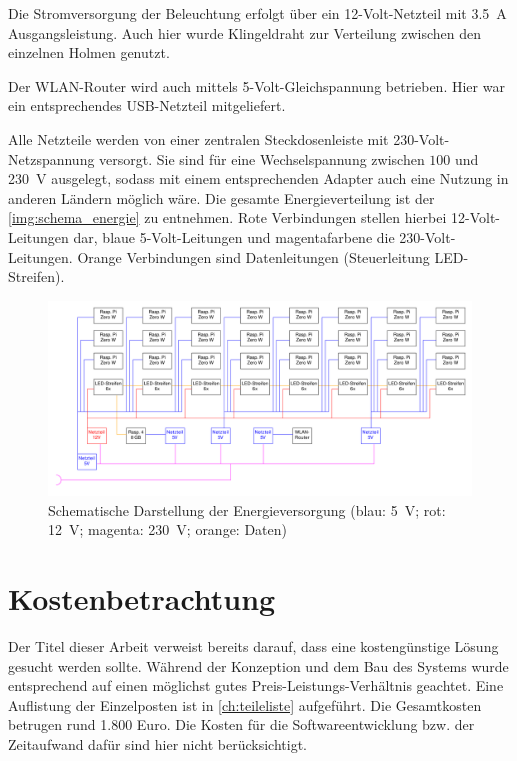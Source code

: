 \documentclass[./00PhotoBox.tex]{subfiles}
\begin{document}
Die Stromversorgung der Beleuchtung erfolgt über ein 12-Volt-Netzteil mit \SI{3,5}{\ampere} Ausgangsleistung. Auch hier wurde Klingeldraht zur Verteilung zwischen den einzelnen Holmen genutzt.

Der WLAN-Router wird auch mittels 5-Volt-Gleichspannung betrieben. Hier war ein entsprechendes USB-Netzteil mitgeliefert.

Alle Netzteile werden von einer zentralen Steckdosenleiste mit 230-Volt-Netzspannung versorgt. Sie sind für eine Wechselspannung zwischen $100$ und \SI{230}{\volt} ausgelegt, sodass mit einem entsprechenden Adapter auch eine Nutzung in anderen Ländern möglich wäre. Die gesamte Energieverteilung ist der \autoref{img:schema_energie} zu entnehmen. Rote Verbindungen stellen hierbei 12-Volt-Leitungen dar, blaue 5-Volt-Leitungen und magentafarbene die 230-Volt-Leitungen. Orange Verbindungen sind Datenleitungen (Steuerleitung LED-Streifen).

\begin{figure}
    \centering
    \includegraphics[width=1.\textwidth]{./img/uml/uml_energie.pdf}
    \caption{Schematische Darstellung der Energieversorgung (blau: \SI{5}{\volt}; rot: \SI{12}{\volt}; magenta: \SI{230}{\volt}; orange: Daten)}
    \label{img:schema_energie}
\end{figure}


\section{Kostenbetrachtung}
Der Titel dieser Arbeit verweist bereits darauf, dass eine kostengünstige Lösung gesucht werden sollte. Während der Konzeption und dem Bau des Systems wurde entsprechend auf einen möglichst gutes Preis-Leistungs-Verhältnis geachtet. Eine Auflistung der Einzelposten ist in \autoref{ch:teileliste} aufgeführt. Die Gesamtkosten betrugen rund 1.800 Euro. Die Kosten für die Softwareentwicklung bzw. der Zeitaufwand dafür sind hier nicht berücksichtigt.
\end{document}
